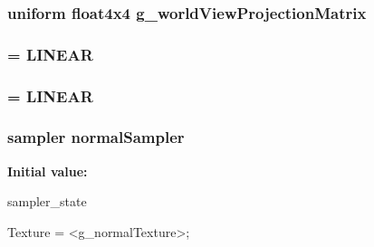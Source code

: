 \subsubsection[{g\_\-worldViewProjectionMatrix}]{\setlength{\rightskip}{0pt plus 5cm}uniform float4x4 {\bf g\_\-worldViewProjectionMatrix}}\label{shader_8fx_8c_a016ef074eba9134f6e07c1c37d39a529}
\subsubsection[{MagFilter}]{ = LINEAR}\label{shader_8fx_8c_acdb4135d7c8c6e54280364c796461585}
\subsubsection[{MipFilter}]{ = LINEAR}\label{shader_8fx_8c_a2d427a0f2ae0e99d2d700cf27d0417aa}
\subsubsection[{normalSampler}]{\setlength{\rightskip}{0pt plus 5cm}sampler {\bf normalSampler}}\label{shader_8fx_8c_af40081d7f76c1660b4fb4f1e82a64a25}
{\bfseries Initial value:}
\begin{DoxyCode}
 sampler_state
{
        Texture = <g_normalTexture>;
        
        
        
        
    
    
}
\end{DoxyCode}
